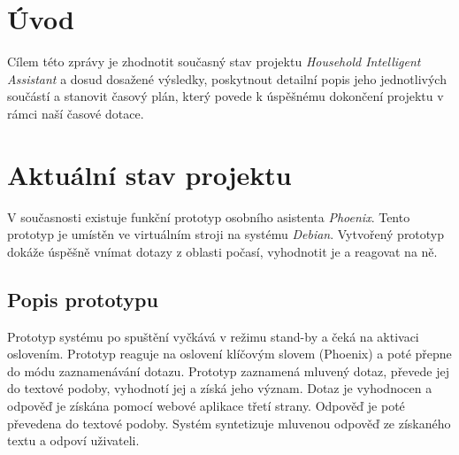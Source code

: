 \documentclass[12pt,a4paper]{article}
\begin{document}
\newpage
\pagestyle{plain}     %
\setcounter{page}{1}
\addtolength{\voffset}{-3cm}
\addtolength{\headheight}{2cm}

\pagestyle{fancy}
\lfoot{}
\cfoot{\thepage}
\rfoot{}
\renewcommand{\headrulewidth}{0.4pt}

\tableofcontents

\newpage
\section{Úvod}
Cílem této zprávy je zhodnotit současný stav projektu \textit{Household Intelligent Assistant} a dosud dosažené výsledky, poskytnout detailní popis jeho jednotlivých součástí a stanovit časový plán, který povede k úspěšnému dokončení projektu v rámci naší časové dotace.
\section{Aktuální stav projektu}
V současnosti existuje funkční prototyp osobního asistenta \textit{Phoenix}. Tento prototyp je umístěn ve virtuálním stroji na systému \textit{Debian}. Vytvořený prototyp dokáže úspěšně vnímat dotazy z oblasti počasí, vyhodnotit je a reagovat na ně. 

\subsection{Popis prototypu}
Prototyp systému po spuštění vyčkává v režimu stand-by a čeká na aktivaci oslovením. Prototyp reaguje na oslovení klíčovým slovem (Phoenix) a poté přepne do módu zaznamenávání dotazu. Prototyp zaznamená mluvený dotaz, převede jej do textové podoby, vyhodnotí jej a získá jeho význam. Dotaz je vyhodnocen a odpověď je získána pomocí webové aplikace třetí strany. Odpověď je poté převedena do textové podoby. Systém syntetizuje mluvenou odpověď ze získaného textu a odpoví uživateli.
\end{document}
